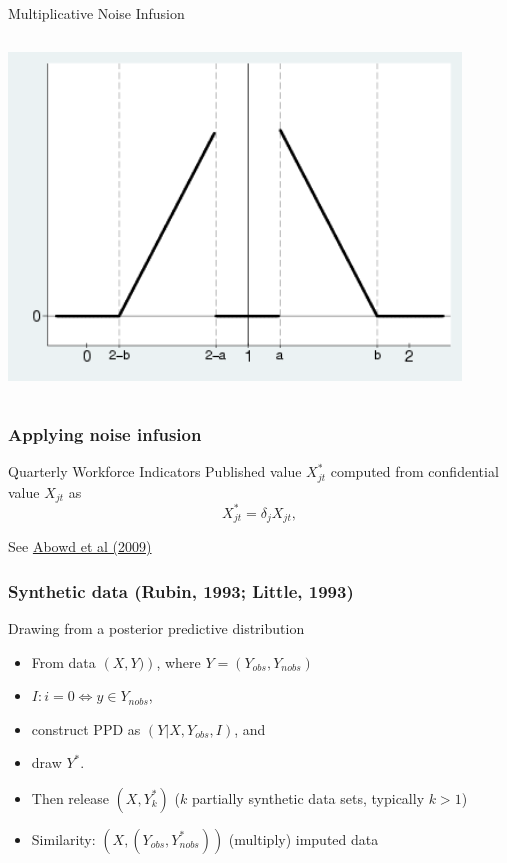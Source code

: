 \begin{frame}
\begin{block}{Multiplicative Noise Infusion}
\begin{columns}
\begin{column}{0.3\textwidth}
			\includegraphics[width=0.9\textwidth]{fuzzfactors}
\vspace{0.5\textheight}
\end{column}	
\end{columns}
\end{block}
\end{frame}

\begin{frame}
	\frametitle{Applying noise infusion}
	\begin{block}{Quarterly Workforce Indicators}
Published value $X_{jt}^{\ast}$ computed from confidential value $X_{jt}$ as
\begin{equation}
X_{jt}^{\ast }=\delta _{j}X_{jt},  \label{eq:fuzz_totals}
\end{equation}%
	\end{block}
	See \href{https://ideas.repec.org/h/nbr/nberch/0485.html}{Abowd et al (2009)}
\end{frame}

\begin{frame}
	\frametitle{Synthetic data (Rubin, 1993; Little, 1993)}
	\begin{block}{Drawing from a posterior predictive distribution}
		\begin{itemize}
			\item[\ ] From data $\left ( X, Y ) \right )$, where $Y=\left ( Y_{obs}, Y_{nobs} \right )$
			\item[\ ] $I: i=0 \iff y \in Y_{nobs}$, 
			\item[\ ] construct PPD as $\left ( Y | X, Y_{obs}, I \right )$, and 
			\item[\ ] draw $Y^{\ast}$. 
			\item[\ ] Then release $\left ( X, Y^{\ast}_k \right )$ ($k$ partially synthetic data sets, typically $k>1$)
			\item[\ ] Similarity: $\left (X, (Y_{obs},Y_{nobs}^{\ast} ) \right )$ (multiply) imputed data
		\end{itemize}
	\end{block}
\end{frame}



